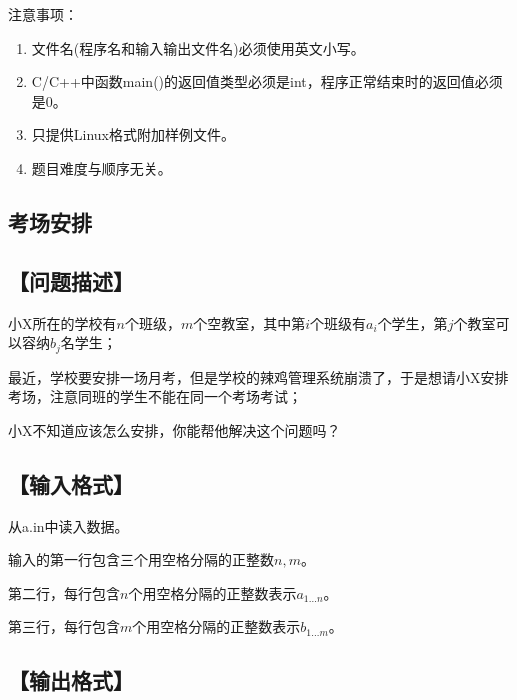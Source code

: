 \documentclass{article}
\begin{document}
	注意事项：
	\begin{enumerate}

		\item 文件名(程序名和输入输出文件名)必须使用英文小写。
		
		\item C/C++中函数main()的返回值类型必须是int，程序正常结束时的返回值必须是0。

		\item 只提供Linux格式附加样例文件。

		\item 题目难度与顺序无关。
		
	\end{enumerate}

	\newpage

	\begin{center}
		\section{考场安排}
	\end{center}

		\subsection*{【问题描述】}
		
			小X所在的学校有\(n\)个班级，\(m\)个空教室，其中第\(i\)个班级有\(a_i\)个学生，第\(j\)个教室可以容纳\(b_j\)名学生；
			
			最近，学校要安排一场月考，但是学校的辣鸡管理系统崩溃了，于是想请小X安排考场，注意同班的学生不能在同一个考场考试；

			小X不知道应该怎么安排，你能帮他解决这个问题吗？			

		\subsection*{【输入格式】}

			从a.in中读入数据。

			输入的第一行包含三个用空格分隔的正整数\(n,m\)。

			第二行，每行包含\(n\)个用空格分隔的正整数表示\(a_{1\ldots n}\)。

			第三行，每行包含\(m\)个用空格分隔的正整数表示\(b_{1\ldots m}\)。

		\subsection*{【输出格式】}
\end{document}
